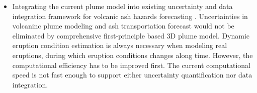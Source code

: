 \begin{itemize}
\item Integrating the current plume model into existing uncertainty and data integration framework for volcanic ash hazards forecasting \citep{patra2013challenges, madankan2014computation, stefanescu2014temporal}. Uncertainties in volcaninc plume modeling and ash transportation forecast would not be eliminated by comprehensive first-principle based 3D plume model. Dynamic eruption condition estimation is always necessary when modeling real eruptions, during which eruption conditions changes along time. However, the computational efficiency has to be improved first. The current computational speed is not fast enough to support either uncertainty quantification nor data integration.
\end{itemize}